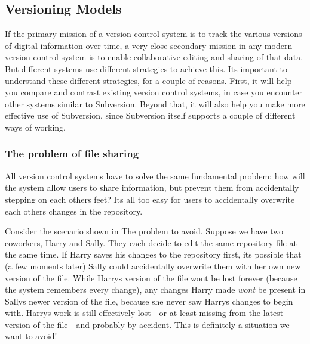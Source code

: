 \subsection{Versioning Models}\label{svn.basic.vsn-models}

If the primary mission of a version control system is to track the
various versions of digital information over time, a very close
secondary mission in any modern version control system is to enable
collaborative editing and sharing of that data. But different systems
use different strategies to achieve this. It\textquotesingle s important
to understand these different strategies, for a couple of reasons.
First, it will help you compare and contrast existing version control
systems, in case you encounter other systems similar to Subversion.
Beyond that, it will also help you make more effective use of
Subversion, since Subversion itself supports a couple of different ways
of working.

\subsubsection{The problem of file
sharing}\label{svn.basic.vsn-models.problem-sharing}

All version control systems have to solve the same fundamental problem:
how will the system allow users to share information, but prevent them
from accidentally stepping on each other\textquotesingle s feet?
It\textquotesingle s all too easy for users to accidentally overwrite
each other\textquotesingle s changes in the repository.

Consider the scenario shown in
\hyperref[svn.basic.vsn-models.problem-sharing.dia-1]{The problem to
avoid}. Suppose we have two coworkers, Harry and Sally. They each decide
to edit the same repository file at the same time. If Harry saves his
changes to the repository first, it\textquotesingle s possible that (a
few moments later) Sally could accidentally overwrite them with her own
new version of the file. While Harry\textquotesingle s version of the
file won\textquotesingle t be lost forever (because the system remembers
every change), any changes Harry made \emph{won\textquotesingle t} be
present in Sally\textquotesingle s newer version of the file, because
she never saw Harry\textquotesingle s changes to begin with.
Harry\textquotesingle s work is still effectively lost---or at least
missing from the latest version of the file---and probably by accident.
This is definitely a situation we want to avoid!

